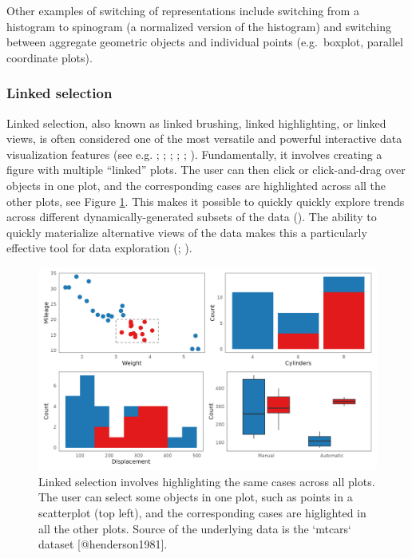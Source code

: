 \documentclass[
]{book}
\theoremstyle{definition}
\theoremstyle{definition}
\theoremstyle{definition}
\theoremstyle{definition}
\theoremstyle{remark}
\begin{document}
Other examples of switching of representations include switching from a histogram to spinogram (a normalized version of the histogram) and switching between aggregate geometric objects and individual points (e.g.~boxplot, parallel coordinate plots).

\subsubsection{Linked selection}\label{linked-selection}

Linked selection, also known as linked brushing, linked highlighting, or linked views, is often considered one of the most versatile and powerful interactive data visualization features (see e.g. ; ; ; ; ; ). Fundamentally, it involves creating a figure with multiple ``linked'' plots. The user can then click or click-and-drag over objects in one plot, and the corresponding cases are highlighted across all the other plots, see Figure \ref{fig:linked-selection}. This makes it possible to quickly quickly explore trends across different dynamically-generated subsets of the data (). The ability to quickly materialize alternative views of the data makes this a particularly effective tool for data exploration (; ).

\begin{figure}

{\centering \includegraphics[width=1\linewidth,height=1\textheight]{./figures/linked-selection} 

}

\caption{Linked selection involves highlighting the same cases across all plots. The user can select some objects in one plot, such as points in a scatterplot (top left), and the corresponding cases are higlighted in all the other plots. Source of the underlying data is the `mtcars` dataset [@henderson1981].}\label{fig:linked-selection}
\end{figure}
\end{document}
